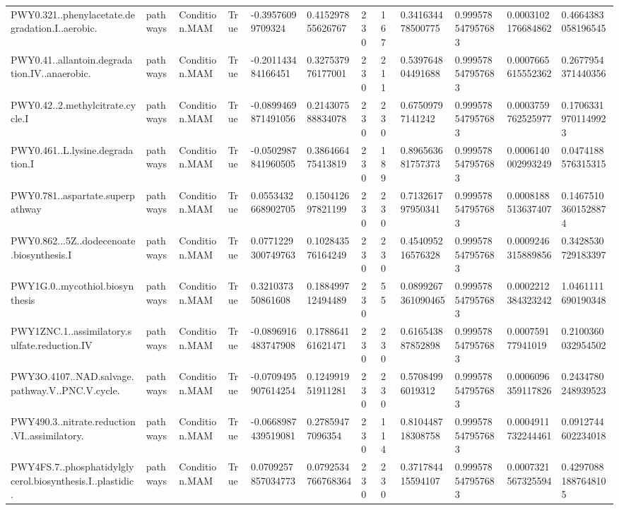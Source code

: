 \begin{longtable}{llllllllllll}
PWY0.321..phenylacetate.degradation.I..aerobic. & pathways & Condition.MAM & True & -0.39576099709324 & 0.415297855626767 & 230 & 167 & 0.341634478500775 & 0.999578547957683 & 0.0003102176684862 & 0.4664383058196545 \\
PWY0.41..allantoin.degradation.IV..anaerobic. & pathways & Condition.MAM & True & -0.201143484166451 & 0.327537976177001 & 230 & 211 & 0.539764804491688 & 0.999578547957683 & 0.0007665615552362 & 0.2677954371440356 \\
PWY0.42..2.methylcitrate.cycle.I & pathways & Condition.MAM & True & -0.0899469871491056 & 0.214307588834078 & 230 & 230 & 0.67509797141242 & 0.999578547957683 & 0.0003759762525977 & 0.17063319701149923 \\
PWY0.461..L.lysine.degradation.I & pathways & Condition.MAM & True & -0.0502987841960505 & 0.386466475413819 & 230 & 189 & 0.896563681757373 & 0.999578547957683 & 0.0006140002993249 & 0.0474188576315315 \\
PWY0.781..aspartate.superpathway & pathways & Condition.MAM & True & 0.0553432668902705 & 0.150412697821199 & 230 & 230 & 0.713261797950341 & 0.999578547957683 & 0.0008188513637407 & 0.14675103601528874 \\
PWY0.862...5Z..dodecenoate.biosynthesis.I & pathways & Condition.MAM & True & 0.0771229300749763 & 0.102843576164249 & 230 & 230 & 0.454095216576328 & 0.999578547957683 & 0.0009246315889856 & 0.3428530729183397 \\
PWY1G.0..mycothiol.biosynthesis & pathways & Condition.MAM & True & 0.321037350861608 & 0.188499712494489 & 230 & 55 & 0.0899267361090465 & 0.999578547957683 & 0.0002212384323242 & 1.0461111690190348 \\
PWY1ZNC.1..assimilatory.sulfate.reduction.IV & pathways & Condition.MAM & True & -0.0896916483747908 & 0.178864161621471 & 230 & 230 & 0.616543887852898 & 0.999578547957683 & 0.000759177941019 & 0.2100360032954502 \\
PWY3O.4107..NAD.salvage.pathway.V..PNC.V.cycle. & pathways & Condition.MAM & True & -0.0709495907614254 & 0.124991951911281 & 230 & 230 & 0.57084996019312 & 0.999578547957683 & 0.0006096359117826 & 0.2434780248939523 \\
PWY490.3..nitrate.reduction.VI..assimilatory. & pathways & Condition.MAM & True & -0.0668987439519081 & 0.27859477096354 & 230 & 114 & 0.810448718308758 & 0.999578547957683 & 0.0004911732244461 & 0.0912744602234018 \\
PWY4FS.7..phosphatidylglycerol.biosynthesis.I..plastidic. & pathways & Condition.MAM & True & 0.0709257857034773 & 0.0792534766768364 & 230 & 230 & 0.371784415594107 & 0.999578547957683 & 0.0007321567325594 & 0.42970881887648105 \\

\end{longtable}
